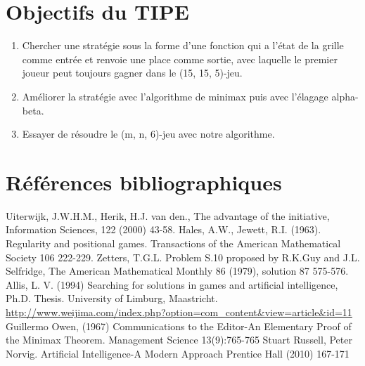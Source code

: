 \documentclass[12pt,a4paper]{article}
\begin{document}
\section*{\bfseries Objectifs du TIPE}
\begin{enumerate}
    \item Chercher une stratégie sous la forme d'une fonction qui a l'état de la grille comme entrée et renvoie une place comme sortie, avec laquelle le premier joueur peut toujours gagner dans le (15, 15, 5)-jeu.
    \item Améliorer la stratégie avec l'algorithme de minimax puis avec l'élagage alpha-beta.
    \item Essayer de résoudre le (m, n, 6)-jeu avec notre algorithme.
\end{enumerate}
\section*{\bfseries Références bibliographiques}
\begingroup
\renewcommand{\section}[2]{}%
\begin{thebibliography}{10}
    Uiterwijk, J.W.H.M., Herik, H.J. van den., The advantage of the initiative, Information Sciences, 122 (2000) 43-58.
    Hales, A.W., Jewett, R.I. (1963). Regularity and positional games. Transactions of the American Mathematical Society 106 222-229.
    Zetters, T.G.L. Problem S.10 proposed by R.K.Guy and J.L. Selfridge, The American Mathematical Monthly 86 (1979), solution 87 575-576.
    Allis, L. V. (1994) Searching for solutions in games and artificial intelligence, Ph.D. Thesis. University of Limburg, Maastricht.
    \url{http://www.weijima.com/index.php?option=com_content&view=article&id=11}
    Guillermo Owen, (1967) Communications to the Editor-An Elementary Proof of the Minimax Theorem. Management Science 13(9):765-765
    Stuart Russell, Peter Norvig. Artificial Intelligence-A Modern Approach Prentice Hall (2010) 167-171
\end{thebibliography}
\endgroup
\end{document}
